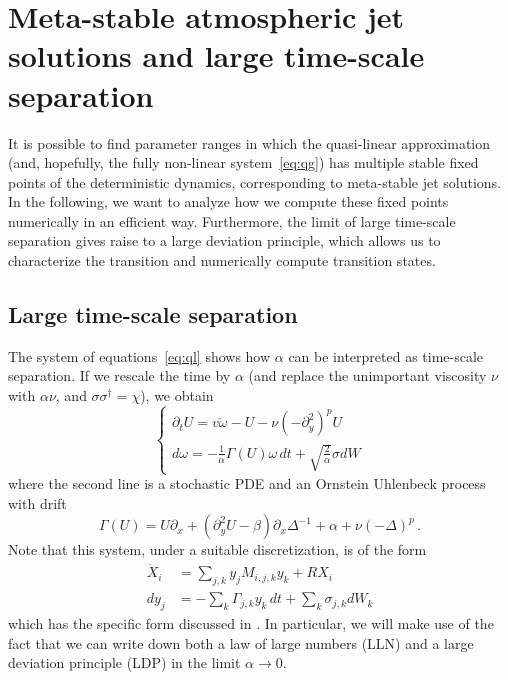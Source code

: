 \documentclass[12pt]{amsart}
\begin{document}
\section{Meta-stable atmospheric jet solutions and large time-scale separation}

It is possible to find parameter ranges in which the quasi-linear
approximation (and, hopefully, the fully non-linear
system~\eqref{eq:qg}) has multiple stable fixed points of the
deterministic dynamics, corresponding to meta-stable jet solutions. In
the following, we want to analyze how we compute these fixed points
numerically in an efficient way. Furthermore, the limit of large
time-scale separation gives raise to a large deviation principle,
which allows us to characterize the transition and numerically compute
transition states.

\subsection{Large time-scale separation}

The system of equations~\eqref{eq:ql} shows how $\alpha$ can be interpreted as
time-scale separation. If we rescale the time by $\alpha$ (and replace
the unimportant viscosity $\nu$ with $\alpha\nu$, and
$\sigma\sigma^\dagger=\chi$), we obtain
\begin{equation}
  \begin{cases}
    \partial_t U = \overline{v\omega}- U -\nu(-\partial_y^2)^p U\\
    d \omega = -\frac{1}{\alpha}\Gamma(U)\omega\,dt  + \sqrt{\frac{2}{\alpha}} \sigma dW
  \end{cases}
\end{equation}
where the second line is a stochastic PDE and an Ornstein Uhlenbeck
process with drift 
\begin{equation}
  \Gamma(U) = U\partial_x +(\partial_y^2 U-\beta)\partial_x \Delta^{-1} + \alpha + \nu(-\Delta)^p\,.
\end{equation}
Note that this system, under a suitable discretization, is of the form
\begin{equation*}
  \begin{aligned}
    \dot X_i &= \sum_{j,k} y_j M_{i,j,k} y_k + R X_i\\
    dy_j &= -\sum_k \Gamma_{j,k} y_k\,dt + \sum_k \sigma_{j,k} dW_k
  \end{aligned}
\end{equation*}
which has the specific form discussed in
\cite{bouchet-grafke-tangarife-etal:2016}. In particular, we will make
use of the fact that we can write down both a law of large numbers
(LLN) and a large deviation principle (LDP) in the limit $\alpha\to0$.
\end{document}
